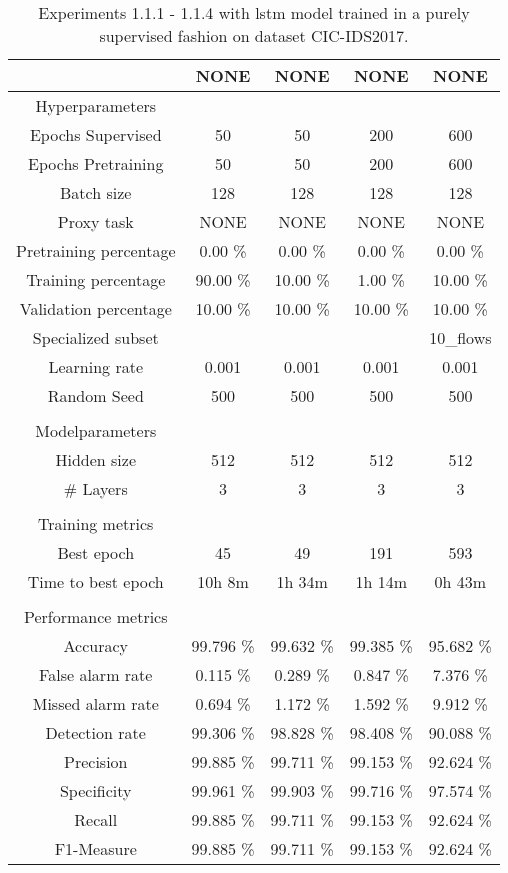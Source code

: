 \begin{table}[htb]
    \centering
    \begin{tabular}{@{}ccccc@{}}
        \toprule
         &  NONE &  NONE &  NONE &  NONE \\
        \midrule
        Hyperparameters &  &  &  &  \\
        Epochs Supervised &  50 &  50 &  200 &  600 \\
        Epochs Pretraining &  50 &  50 &  200 &  600 \\
        Batch size &  128 &  128 &  128 &  128 \\
        Proxy task &  NONE &  NONE &  NONE &  NONE \\
        Pretraining percentage &  0.00 \% &  0.00 \% &  0.00 \% &  0.00 \% \\
        Training percentage &  90.00 \% &  10.00 \% &  1.00 \% &  10.00 \% \\
        Validation percentage &  10.00 \% &  10.00 \% &  10.00 \% &  10.00 \% \\
        Specialized subset &   &   &   &  10\_flows \\
        Learning rate &  0.001 &  0.001 &  0.001 &  0.001 \\
        Random Seed &  500 &  500 &  500 &  500 \\
         \\
        Modelparameters &  &  &  &  \\
        Hidden size &  512 &  512 &  512 &  512 \\
        \# Layers &  3 &  3 &  3 &  3 \\
         \\
        Training metrics &  &  &  &  \\
        Best epoch &  45 &  49 &  191 &  593 \\
        Time to best epoch &  10h 8m &  1h 34m &  1h 14m &  0h 43m \\
         \\
        Performance metrics &  &  &  &  \\
        Accuracy &  99.796 \% &  99.632 \% &  99.385 \% &  95.682 \% \\
        False alarm rate &  0.115 \% &  0.289 \% &  0.847 \% &  7.376 \% \\
        Missed alarm rate &  0.694 \% &  1.172 \% &  1.592 \% &  9.912 \% \\
        Detection rate &  99.306 \% &  98.828 \% &  98.408 \% &  90.088 \% \\
        Precision &  99.885 \% &  99.711 \% &  99.153 \% &  92.624 \% \\
        Specificity &  99.961 \% &  99.903 \% &  99.716 \% &  97.574 \% \\
        Recall &  99.885 \% &  99.711 \% &  99.153 \% &  92.624 \% \\
        F1-Measure &  99.885 \% &  99.711 \% &  99.153 \% &  92.624 \% \\
        \bottomrule
    \end{tabular}
    \caption{Experiments 1.1.1 - 1.1.4 with \gls{lstm} model trained in a purely supervised fashion on dataset CIC-IDS2017.}
    \label{table:results:lstm:flows_supervised}
\end{table}